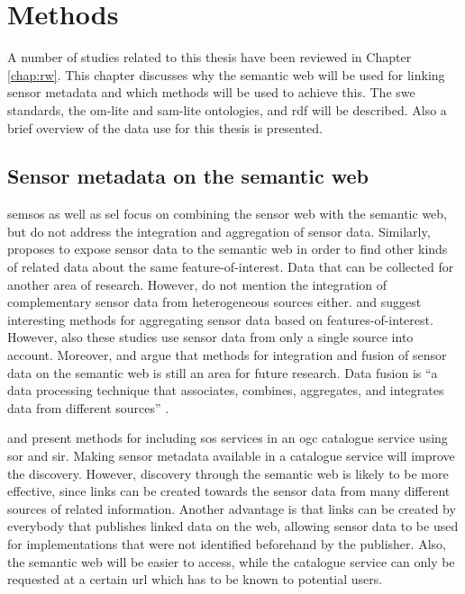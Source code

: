 


\chapter{Methods}
\label{chap:methods}

A number of studies related to this thesis have been reviewed in Chapter \ref{chap:rw}. This chapter discusses why the semantic web will be used for linking sensor metadata and which methods will be used to achieve this. The \ac{swe} standards, the om-lite and sam-lite ontologies, and \ac{rdf} will be described. Also a brief overview of the data use for this thesis is presented.   

\section{Sensor metadata on the semantic web}
\ac{semsos} \citep{SSW:Henson, SSW:Pschorr} as well as \ac{sel} \citep{SSW:Janowicz} focus on combining the sensor web with the semantic web, but do not address the integration and aggregation of sensor data. Similarly, \cite{SSW:Atkinson} proposes to expose sensor data to the semantic web in order to find other kinds of related data about the same feature-of-interest. Data that can be collected for another area of research. However, \cite{SSW:Atkinson} do not mention the integration of complementary sensor data from heterogeneous sources either. \cite{SSW:Stasch} and \cite{SSW:Stasch3} suggest interesting methods for aggregating sensor data based on features-of-interest. However, also these studies use sensor data from only a single source into account. Moreover, \cite{SSW:Corcho} and \cite{SSW:Ji} argue that methods for integration and fusion of sensor data on the semantic web is still an area for future research. Data fusion is \enquote{a data processing technique that associates, combines, aggregates, and integrates data from different sources} \cite[p. 2]{SSW:Wang2}. 

\cite{SW:OGC3} and \cite{SW:OGC4} present methods for including \ac{sos} services in an \ac{ogc} catalogue service using \ac{sor} and \ac{sir}. Making sensor metadata available in a catalogue service will improve the discovery. However, discovery through the semantic web is likely to be more effective, since links can be created towards the sensor data from many different sources of related information. Another advantage is that links can be created by everybody that publishes linked data on the web, allowing sensor data to be used for implementations that were not identified beforehand by the publisher. Also, the semantic web will be easier to access, while the catalogue service can only be requested at a certain \ac{url} which has to be known to potential users. 

